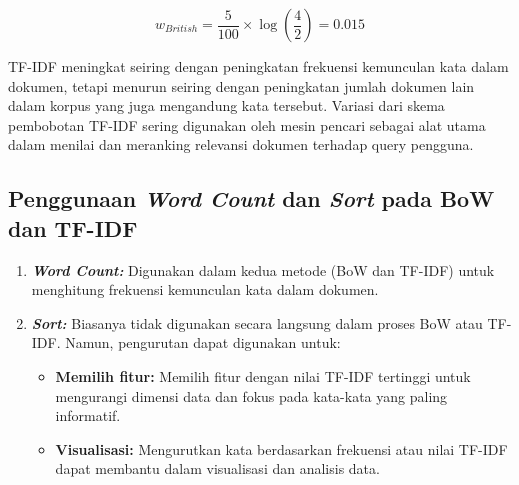 \begin{equation}
w_{British} = \frac{5}{100} \times \log \left(\frac{4}{2}\right) = 0.015
\end{equation}

TF-IDF meningkat seiring dengan peningkatan frekuensi kemunculan kata dalam dokumen, tetapi menurun seiring dengan peningkatan jumlah dokumen lain dalam korpus yang juga mengandung kata tersebut. Variasi dari skema pembobotan TF-IDF sering digunakan oleh mesin pencari sebagai alat utama dalam menilai dan meranking relevansi dokumen terhadap query pengguna.

\subsection{Penggunaan \textit{Word Count} dan \textit{Sort} pada BoW dan TF-IDF}

\begin{enumerate}
    \item \textbf{\textit{Word Count:}} Digunakan dalam kedua metode (BoW dan TF-IDF) untuk menghitung frekuensi kemunculan kata dalam dokumen.
    \item \textbf{\textit{Sort:}} Biasanya tidak digunakan secara langsung dalam proses BoW atau TF-IDF. Namun, pengurutan dapat digunakan untuk:
    \begin{itemize}
        \item \textbf{Memilih fitur:} Memilih fitur dengan nilai TF-IDF tertinggi untuk mengurangi dimensi data dan fokus pada kata-kata yang paling informatif. 
        \item \textbf{Visualisasi:} Mengurutkan kata berdasarkan frekuensi atau nilai TF-IDF dapat membantu dalam visualisasi dan analisis data.
    \end{itemize}
\end{enumerate}

